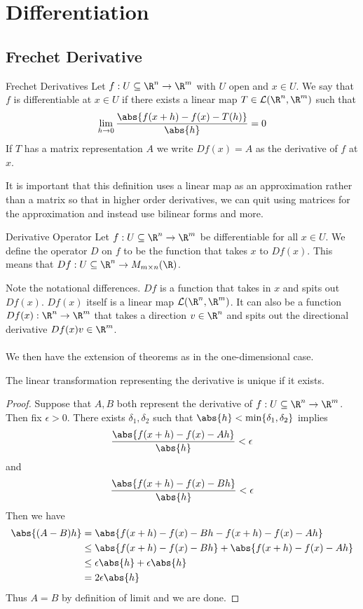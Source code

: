 \documentclass[a4paper]{article}
\begin{document}
\pagebreak
\section{Differentiation}
\subsection{Frechet Derivative}
\begin{defn}{Frechet Derivatives}{} Let $f:U\subseteq\R^n\to\R^m$ with $U$ open and $x\in U$. We say that $f$ is differentiable at $x\in U$ if there exists a linear map $T\in\mathcal{L}(\R^n,\R^m)$ such that $$\lim_{h\to 0}\frac{\abs{f(x +h)-f(x)-T(h)}}{\abs{h}}=0$$ If $T$ has a matrix representation $A$ we write $Df(x)=A$ as the derivative of $f$ at $x$. 
\end{defn}

It is important that this definition uses a linear map as an approximation rather than a matrix so that in higher order derivatives, we can quit using matrices for the approximation and instead use bilinear forms and more. 

\begin{defn}{Derivative Operator}{} Let $f:U\subseteq\R^n\to\R^m$ be differentiable for all $x\in U$. We define the operator $D$ on $f$ to be the function that takes $x$ to $Df(x)$. This means that $Df:U\subseteq\R^n\to M_{m\times n}(\R)$. 
\end{defn}

Note the notational differences. $Df$ is a function that takes in $x$ and spits out $Df(x)$. $Df(x)$ itself is a linear map $\mathcal{L}(\R^n,\R^m)$. It can also be a function $Df(x):\R^n\to\R^m$ that takes a direction $v\in\R^n$ and spits out the directional derivative $Df(x)v\in\R^m$. \\~\\

We then have the extension of theorems as in the one-dimensional case. 

\begin{thm}{}{} The linear transformation representing the derivative is unique if it exists. \tcbline
\begin{proof}
Suppose that $A,B$ both represent the derivative of $f:U\subseteq\R^n\to\R^m$. Then fix $\epsilon>0$. There exists $\delta_1,\delta_2$ such that $\abs{h}<\min\{\delta_1,\delta_2\}$ implies $$\frac{\abs{f(x+h)-f(x)-Ah}}{\abs{h}}<\epsilon$$ and $$\frac{\abs{f(x+h)-f(x)-Bh}}{\abs{h}}<\epsilon$$ Then we have 
\begin{align*}
\abs{(A-B)h}&=\abs{f(x+h)-f(x)-Bh-f(x+h)-f(x)-Ah}\\
&\leq\abs{f(x+h)-f(x)-Bh}+\abs{f(x+h)-f(x)-Ah}\\
&\leq\epsilon\abs{h}+\epsilon\abs{h}\\
&=2\epsilon\abs{h}
\end{align*}
Thus $A=B$ by definition of limit and we are done. 
\end{proof}
\end{thm}
\end{document}
